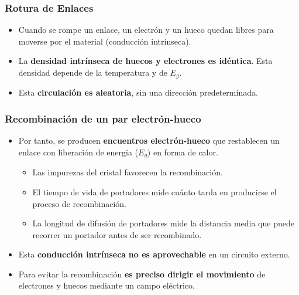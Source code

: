 \documentclass[xcolor=dvipsnames]{beamer}
\begin{document}
\begin{frame}
  \frametitle{Rotura de Enlaces}

  \begin{itemize}
  \item Cuando se rompe un enlace, un electrón y un hueco quedan
    libres para moverse por el material (conducción intrínseca).
  \item La \textbf{densidad intrínseca de huecos y electrones es
      idéntica}.  Esta densidad depende de la temperatura y de
    $E_{g}$.
  \item Esta \textbf{circulación es aleatoria}, sin una dirección
    predeterminada.
  \end{itemize}

\end{frame}

\begin{frame}
  \frametitle{Recombinación de un par electrón-hueco}

  \begin{itemize}
  \item Por tanto, se producen \textbf{encuentros electrón-hueco} que
    restablecen un enlace con liberación de energia ($E_{g}$) en forma
    de calor.

    \begin{itemize}
    \item Las impurezas del cristal favorecen la recombinación.
    \item El tiempo de vida de portadores mide cuánto tarda en
      producirse el proceso de recombinación.
    \item La longitud de difusión de portadores mide la distancia
      media que puede recorrer un portador antes de ser recombinado.
    \end{itemize}
  \item Esta \textbf{conducción intrínseca} \textbf{no es
      aprovechable} en un circuito externo.
  \item Para evitar la recombinación \textbf{es preciso dirigir el
      movimiento} de electrones y huecos mediante un campo eléctrico.
  \end{itemize}

\end{frame}
\end{document}
